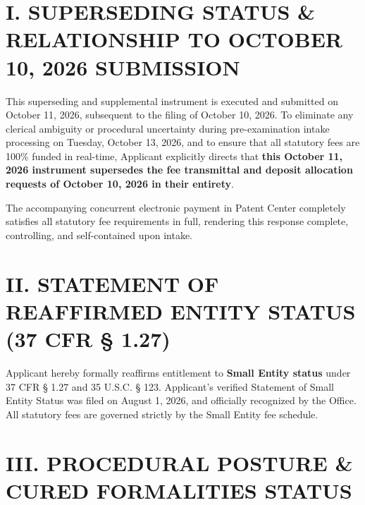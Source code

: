 \documentclass[11pt,letterpaper]{article}
\begin{document}
\section*{I. SUPERSEDING STATUS \& RELATIONSHIP TO OCTOBER 10, 2026 SUBMISSION}

This superseding and supplemental instrument is executed and submitted on October 11, 2026, subsequent to the filing of October 10, 2026. To eliminate any clerical ambiguity or procedural uncertainty during pre-examination intake processing on Tuesday, October 13, 2026, and to ensure that all statutory fees are 100\% funded in real-time, Applicant explicitly directs that \textbf{this October 11, 2026 instrument supersedes the fee transmittal and deposit allocation requests of October 10, 2026 in their entirety}. 

The accompanying concurrent electronic payment in Patent Center completely satisfies all statutory fee requirements in full, rendering this response complete, controlling, and self-contained upon intake.

\section*{II. STATEMENT OF REAFFIRMED ENTITY STATUS (37 CFR \S{} 1.27)}

Applicant hereby formally reaffirms entitlement to \textbf{Small Entity status} under 37 CFR \S{} 1.27 and 35 U.S.C. \S{} 123. Applicant's verified Statement of Small Entity Status was filed on August 1, 2026, and officially recognized by the Office. All statutory fees are governed strictly by the Small Entity fee schedule.

\section*{III. PROCEDURAL POSTURE \& CURED FORMALITIES STATUS}
\end{document}
